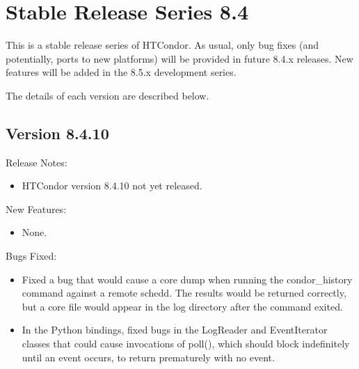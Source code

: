 
\section{\label{sec:History-8-4}Stable Release Series 8.4}

This is a stable release series of HTCondor.
As usual, only bug fixes (and potentially, ports to new platforms)
will be provided in future 8.4.x releases.
New features will be added in the 8.5.x development series.

The details of each version are described below.

\subsection*{\label{sec:New-8-4-10}Version 8.4.10}

\noindent Release Notes:

\begin{itemize}

\item HTCondor version 8.4.10 not yet released.

\end{itemize}


\noindent New Features:

\begin{itemize}

\item None.

\end{itemize}

\noindent Bugs Fixed:

\begin{itemize}

\item Fixed a bug that would cause a core dump when running the condor\_history
command against a remote schedd.  The results would be returned correctly, but a 
core file would appear in the log directory after the command exited.

\item In the Python bindings, fixed bugs in the LogReader and EventIterator
classes that could cause invocations of poll(), which should block
indefinitely until an event occurs, to return prematurely with no event.

\end{itemize}

